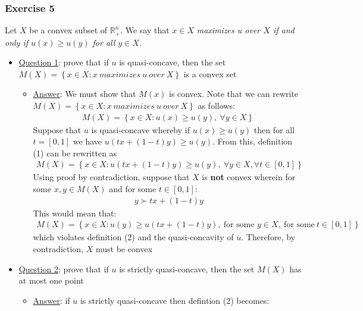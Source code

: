 \documentclass{article}
\begin{document}
\subsubsection{Exercise 5}
Let $X$ be a convex subset of $\mathbb{R}_{+}^{n}$. We say that $x \in X$ \textit{maximizes u over $X$ if and only if $u(x) \geq u(y)$ for all $y \in X$}. \par \vspace{0.3em}
\begin{itemize}
  \item  \underline{Question 1}: prove that if $u$ is quasi-concave, then the set $M(X) = \left\{ x \in X: x \ \textit{maximizes} \ u \ \textit{over} \ X \right\}$ is a convex set
  \begin{itemize}
    \item  \underline{Answer}: We must show that $M(x)$ is convex. Note that we can rewrite $M(X) = \left\{ x \in X: x \ \textit{maximizes} \ u \ \textit{over} \ X \right\}$ as follows:
    \begin{gather*}
      M(X) = \left\{x \in X: u(x) \geq u(y), \ \forall y \in X \right\} \ \tag{1}
    \end{gather*}
    Suppose that $u$ is quasi-concave whereby if $u(x) \geq u(y)$ then for all $t = [0,1]$ we have $u(tx + (1-t)y) \geq u(y)$. From this, definition (1) can be rewritten as
    \begin{gather*}
      M(X) = \left\{x \in X: u(tx + (1-t)y) \geq u(y), \ \forall y \in X, \forall t \in [0,1] \right\} \ \tag{2}
    \end{gather*}
    Using proof by contradiction, suppose that $X$ is \textbf{not} convex wherein for some $x,y \in M(X)$ and for some $t \in [0,1]$:
    \begin{gather*}
      y \succ tx + (1-t) y
    \end{gather*}
    This would mean that:
    \begin{gather*}
      M(X) = \left\{x \in X: u(y) \geq u(tx + (1-t)y), \ \text{for some } y \in X, \ \text{for some} \ t \in [0,1] \right\}
    \end{gather*}
    which violates definition (2) and the quasi-concavity of $u$. Therefore, by contradiction, $X$ must be convex
  \end{itemize}
  \item  \underline{Question 2}: prove that if $u$ is strictly quasi-concave, then the set $M(X)$ has at most one point
  \begin{itemize}
    \item  \underline{Answer}: if $u$ is strictly quasi-concave then defintion (2) becomes:

\end{itemize}
\end{itemize}
\end{document}
